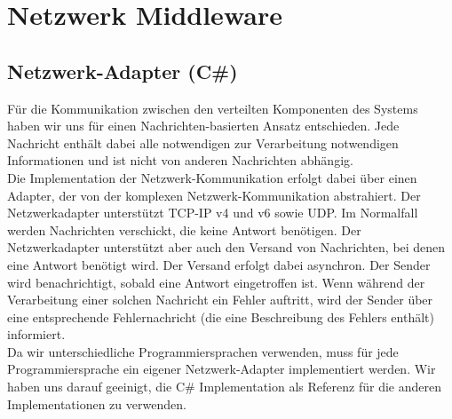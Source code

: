 \section{Netzwerk Middleware}

\subsection{Netzwerk-Adapter (C\#)}


Für die Kommunikation zwischen den verteilten Komponenten des Systems haben wir uns für einen Nachrichten-basierten Ansatz entschieden. Jede Nachricht enthält dabei alle notwendigen zur Verarbeitung notwendigen Informationen und ist nicht von anderen Nachrichten abhängig.\\
Die Implementation der Netzwerk-Kommunikation erfolgt dabei über einen Adapter, der von der komplexen Netzwerk-Kommunikation abstrahiert. Der Netzwerkadapter unterstützt TCP-IP v4 und v6 sowie UDP. Im Normalfall werden Nachrichten verschickt, die keine Antwort benötigen. Der Netzwerkadapter unterstützt aber auch den Versand von Nachrichten, bei denen eine Antwort benötigt wird. Der Versand erfolgt dabei asynchron. Der Sender wird benachrichtigt, sobald eine Antwort eingetroffen ist. Wenn während der Verarbeitung einer solchen Nachricht ein Fehler auftritt, wird der Sender über eine entsprechende Fehlernachricht (die eine Beschreibung des Fehlers enthält) informiert.\\
Da wir unterschiedliche Programmiersprachen verwenden, muss für jede Programmiersprache ein eigener Netzwerk-Adapter implementiert werden. Wir haben uns darauf geeinigt, die C\# Implementation als Referenz für die anderen Implementationen zu verwenden.\\ 


